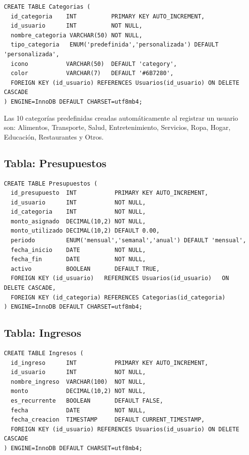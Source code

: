 \begin{lstlisting}[style=sql, caption={DDL de la tabla Categorias}]
CREATE TABLE Categorias (
  id_categoria    INT          PRIMARY KEY AUTO_INCREMENT,
  id_usuario      INT          NOT NULL,
  nombre_categoria VARCHAR(50) NOT NULL,
  tipo_categoria   ENUM('predefinida','personalizada') DEFAULT 'personalizada',
  icono           VARCHAR(50)  DEFAULT 'category',
  color           VARCHAR(7)   DEFAULT '#6B7280',
  FOREIGN KEY (id_usuario) REFERENCES Usuarios(id_usuario) ON DELETE CASCADE
) ENGINE=InnoDB DEFAULT CHARSET=utf8mb4;
\end{lstlisting}

Las 10 categorías predefinidas creadas automáticamente al registrar un usuario son: Alimentos, Transporte, Salud, Entretenimiento, Servicios, Ropa, Hogar, Educación, Restaurantes y Otros.

\subsection{Tabla: Presupuestos}

\begin{lstlisting}[style=sql, caption={DDL de la tabla Presupuestos}]
CREATE TABLE Presupuestos (
  id_presupuesto  INT           PRIMARY KEY AUTO_INCREMENT,
  id_usuario      INT           NOT NULL,
  id_categoria    INT           NOT NULL,
  monto_asignado  DECIMAL(10,2) NOT NULL,
  monto_utilizado DECIMAL(10,2) DEFAULT 0.00,
  periodo         ENUM('mensual','semanal','anual') DEFAULT 'mensual',
  fecha_inicio    DATE          NOT NULL,
  fecha_fin       DATE          NOT NULL,
  activo          BOOLEAN       DEFAULT TRUE,
  FOREIGN KEY (id_usuario)   REFERENCES Usuarios(id_usuario)   ON DELETE CASCADE,
  FOREIGN KEY (id_categoria) REFERENCES Categorias(id_categoria)
) ENGINE=InnoDB DEFAULT CHARSET=utf8mb4;
\end{lstlisting}

\subsection{Tabla: Ingresos}

\begin{lstlisting}[style=sql, caption={DDL de la tabla Ingresos}]
CREATE TABLE Ingresos (
  id_ingreso      INT           PRIMARY KEY AUTO_INCREMENT,
  id_usuario      INT           NOT NULL,
  nombre_ingreso  VARCHAR(100)  NOT NULL,
  monto           DECIMAL(10,2) NOT NULL,
  es_recurrente   BOOLEAN       DEFAULT FALSE,
  fecha           DATE          NOT NULL,
  fecha_creacion  TIMESTAMP     DEFAULT CURRENT_TIMESTAMP,
  FOREIGN KEY (id_usuario) REFERENCES Usuarios(id_usuario) ON DELETE CASCADE
) ENGINE=InnoDB DEFAULT CHARSET=utf8mb4;
\end{lstlisting}

